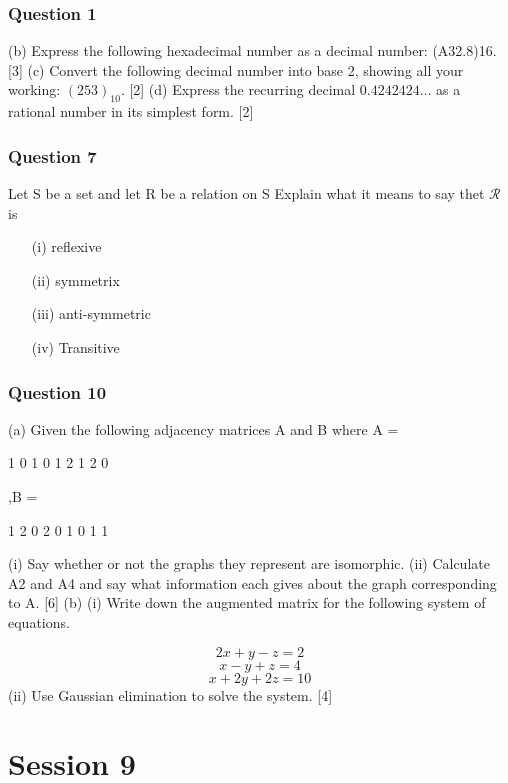 \documentclass[]{report}
\begin{document}
\subsection*{Question 1}

(b) Express the following hexadecimal number as a decimal number: (A32.8)16.
[3]
(c) Convert the following decimal number into base 2, showing all your working:
$(253)_{10}$. [2]
(d) Express the recurring decimal $0.4242424\ldots$
as a rational number in its simplest
form. [2]


\subsection*{Question 7}
Let S be a set and let R be a relation on S
Explain what it means to say thet $\mathcal{R}$ is

\begin{itemize}
	\item[(i)] reflexive
	\item[(ii)] symmetrix
	\item[(iii)] anti-symmetric
	\item[(iv)] Transitive
\end{itemize}


\subsection{Question 10}

(a) Given the following adjacency matrices A and B where
A =

1 0 1
0 1 2
1 2 0

,B =

1 2 0
2 0 1
0 1 1



(i) Say whether or not the graphs they represent are isomorphic.
(ii) Calculate A2 and A4 and say what information each gives about the graph
corresponding to A. [6]
(b) (i) Write down the augmented matrix for the following system of equations.

\[2x + y - z = 2\]
\[x - y + z = 4\]
\[x + 2y + 2z = 10\]
(ii) Use Gaussian elimination to solve the system. [4]


\newpage
\chapter{Session 9}
\end{document}
